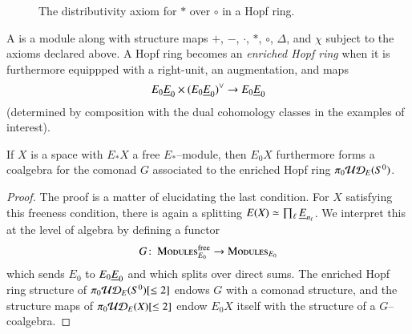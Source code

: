 \begin{figure}
\begin{center}
\end{center}
\caption{The distributivity axiom for $\ast$ over $\circ$ in a Hopf ring.}\label{DistributivityDiagram}
\end{figure}

\begin{definition}
A  is a module along with structure maps $+$, $-$, $\cdot$, $\ast$, $\circ$, $\Delta$, and $\chi$ subject to the axioms declared above.  A Hopf ring becomes an \textit{enriched Hopf ring} when it is furthermore equippped with a right-unit, an augmentation, and maps \[E_0 \underline{\smash{E}}_{0} \times (E_0 \underline{\smash{E}}_{0})^\vee \to E_0 \underline{\smash{E}}_{0}\] (determined by composition with the dual cohomology classes in the examples of interest).
\end{definition}

\begin{lemma}\label{HopfRingFromOneRingSpectrum}
If $X$ is a space with $E_* X$ a free $E_*$--module, then $E_0 X$ furthermore forms a coalgebra for the comonad $G$ associated to the enriched Hopf ring $\pi_0 \mathcal{UD}_E(S^0)$.
\end{lemma}
\begin{proof}
The proof is a matter of elucidating the last condition.  For $X$ satisfying this freeness condition, there is again a splitting $E(X) \simeq \prod_\ell \underline{\smash{E}}_{n_\ell}$.  We interpret this at the level of algebra by defining a functor \[G\colon\thinspace \normalfont\textsc{Modules}_{E_0}^{\mathrm{free}} \to \normalfont\textsc{Modules}_{E_0}\] which sends $E_0$ to $E_0 \underline{\smash{E}}_{0}$ and which splits over direct sums.  The enriched Hopf ring structure of $\pi_0 \mathcal{UD}_E(S^0)[\le 2]$ endows $G$ with a comonad structure, and the structure maps of $\pi_0 \mathcal{UD}_E(X)[\le 2]$ endow $E_0 X$ itself with the structure of a $G$--coalgebra.
\end{proof}

